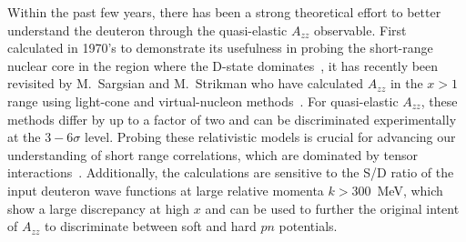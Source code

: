 Within the past few years, there has been a strong theoretical effort to better understand the deuteron through the quasi-elastic $A_{zz}$ observable. First calculated in 1970's to demonstrate its usefulness in probing the short-range nuclear core in the region where the D-state dominates~\cite{Frankfurt:1988nt}, it has recently been revisited by M.~Sargsian and M.~Strikman who have calculated $A_{zz}$ in the $x > 1$ range using light-cone and virtual-nucleon methods~\cite{Sargsian:2014fla}. For quasi-elastic $A_{zz}$, these methods differ by up to a factor of two and can be discriminated experimentally at the $3-6\sigma$ level. Probing these relativistic models is crucial for advancing our understanding of short range correlations, which are dominated by tensor interactions~\cite{Korover:2014dma}. Additionally, the calculations are sensitive to the S/D ratio of the input deuteron wave functions at large relative momenta $k>300$~MeV, which show a large discrepancy at high $x$ and can be used to further the original intent of $A_{zz}$ to discriminate between soft and hard $pn$ potentials. 




